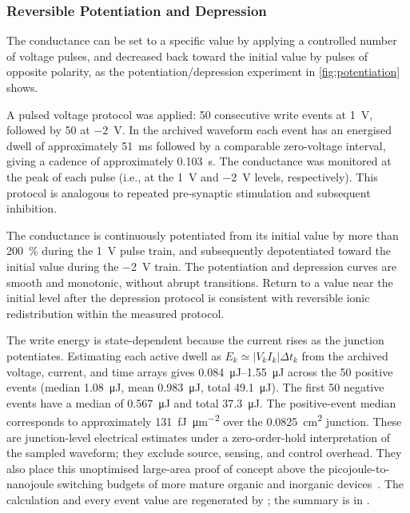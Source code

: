 \documentclass[12pt, twoside]{report}
\begin{document}
\subsubsection{Reversible Potentiation and Depression}

The conductance can be set to a specific value by applying a controlled number of voltage pulses, and decreased back toward the initial value by pulses of opposite polarity, as the potentiation/depression experiment in \cref{fig:potentiation} shows.

A pulsed voltage protocol was applied: 50 consecutive write events at \SI{+1}{\volt}, followed by 50 at \SI{-2}{\volt}. In the archived waveform each event has an energised dwell of approximately \SI{51}{\milli\second} followed by a comparable zero-voltage interval, giving a cadence of approximately \SI{0.103}{\second}. The conductance was monitored at the peak of each pulse (i.e., at the \SI{+1}{\volt} and \SI{-2}{\volt} levels, respectively). This protocol is analogous to repeated pre-synaptic stimulation and subsequent inhibition.

The conductance is continuously potentiated from its initial value by more than \SI{200}{\percent} during the \SI{+1}{\volt} pulse train, and subsequently depotentiated toward the initial value during the \SI{-2}{\volt} train. The potentiation and depression curves are smooth and monotonic, without abrupt transitions. Return to a value near the initial level after the depression protocol is consistent with reversible ionic redistribution within the measured protocol.

The write energy is state-dependent because the current rises as the junction potentiates. Estimating each active dwell as \(E_k\simeq |V_k I_k|\Delta t_k\) from the archived voltage, current, and time arrays gives \SIrange{0.084}{1.55}{\micro\joule} across the 50 positive events (median \SI{1.08}{\micro\joule}, mean \SI{0.983}{\micro\joule}, total \SI{49.1}{\micro\joule}). The first 50 negative events have a median of \SI{0.567}{\micro\joule} and total \SI{37.3}{\micro\joule}. The positive-event median corresponds to approximately \SI{131}{\femto\joule\per\micro\metre\squared} over the \SI{0.0825}{\square\centi\metre} junction. These are junction-level electrical estimates under a zero-order-hold interpretation of the sampled waveform; they exclude source, sensing, and control overhead. They also place this unoptimised large-area proof of concept above the picojoule-to-nanojoule switching budgets of more mature organic and inorganic devices~\cite{Xiao2016,YangStrukovStewart2013}. The calculation and every event value are regenerated by ; the summary is in .
\end{document}
